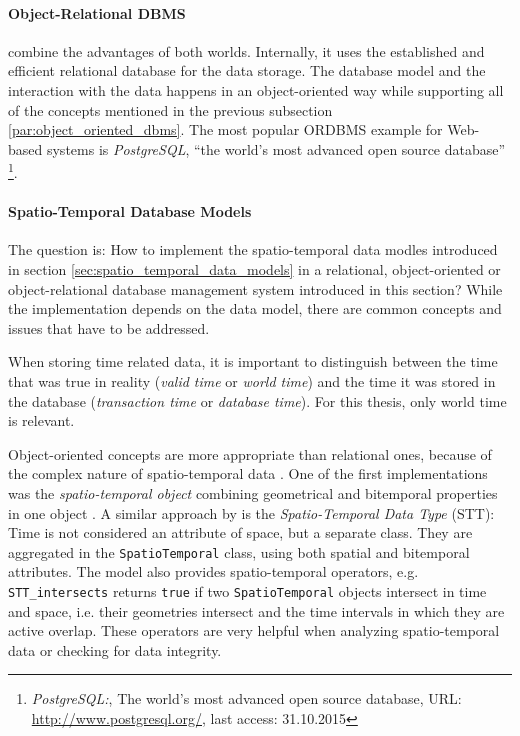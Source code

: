 

\paragraph{Object-Relational DBMS} %
\label{par:object_relational_dbms}

combine the advantages of both worlds. Internally, it uses the established and efficient relational database for the data storage. The database model and the interaction with the data happens in an object-oriented way while supporting all of the concepts mentioned in the previous subsection \ref{par:object_oriented_dbms}. The most popular ORDBMS example for Web-based systems is \emph{PostgreSQL}, ``the world's most advanced open source database''
\footnote{
  \emph{PostgreSQL:},
  The world's most advanced open source database,
  URL: \url{http://www.postgresql.org/},
  last access: 31.10.2015
}.



\paragraph{Spatio-Temporal Database Models} %
\label{par:spatio_temporal_database_models}

The question is: How to implement the spatio-temporal data modles introduced in section \ref{sec:spatio_temporal_data_models} in a relational, object-oriented or object-relational database management system introduced in this section? While the implementation depends on the data model, there are common concepts and issues that have to be addressed.

When storing time related data, it is important to distinguish between the time that was true in reality (\emph{valid time} or \emph{world time}) and the time it was stored in the database (\emph{transaction time} or \emph{database time}). For this thesis, only world time is relevant.

Object-oriented concepts are more appropriate than relational ones, because of the complex nature of spatio-temporal data \cite[section 3.9]{pelekis04stdms}. One of the first implementations was the \emph{spatio-temporal object} combining geometrical and bitemporal properties in one object \cite{worboys90stdm}. A similar approach by \cite{raza12} is the \emph{Spatio-Temporal Data Type} (STT): Time is not considered an attribute of space, but a separate class. They are aggregated in the \texttt{SpatioTemporal} class, using both spatial and bitemporal attributes. The model also provides spatio-temporal operators, e.g. \texttt{STT\_intersects} returns \texttt{true} if two \texttt{SpatioTemporal} objects intersect in time and space, i.e. their geometries intersect and the time intervals in which they are active overlap. These operators are very helpful when analyzing spatio-temporal data or checking for data integrity.

